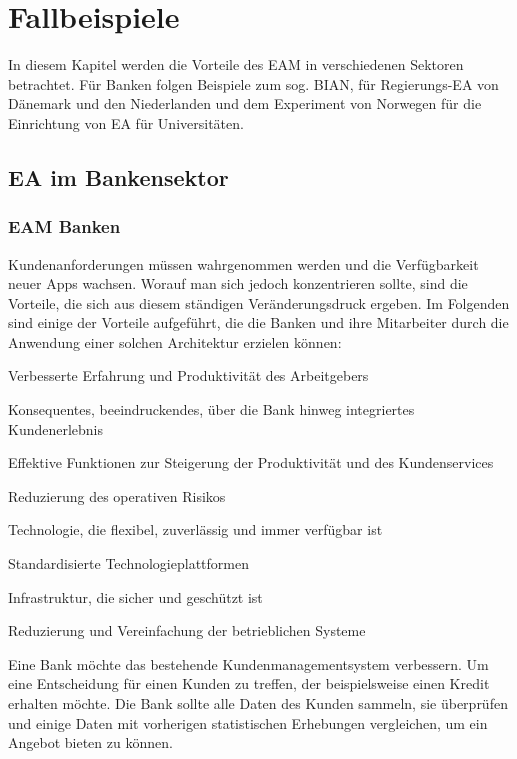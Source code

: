 \documentclass[
	doc,
	a4paper,
	helv
	]{apa6}
\begin{document}
\section{Fallbeispiele}
In diesem Kapitel werden die Vorteile des EAM in verschiedenen Sektoren betrachtet. Für Banken folgen Beispiele zum sog. BIAN, für Regierungs-EA von Dänemark und den Niederlanden und dem Experiment von Norwegen für die Einrichtung von EA für Universitäten.

\subsection{EA im Bankensektor}
\subsubsection{EAM Banken}

Kundenanforderungen müssen wahrgenommen werden und die Verfügbarkeit neuer Apps wachsen. Worauf man sich jedoch konzentrieren sollte, sind die Vorteile, die sich aus diesem ständigen Veränderungsdruck ergeben. Im Folgenden sind einige der Vorteile aufgeführt, die die Banken und ihre Mitarbeiter durch die Anwendung einer solchen Architektur erzielen können:

\begin{APAitemize}
\item Verbesserte Erfahrung und Produktivität des Arbeitgebers 
\item Konsequentes, beeindruckendes, über die Bank hinweg integriertes Kundenerlebnis
\item Effektive Funktionen zur Steigerung der Produktivität und des Kundenservices
\item Reduzierung des operativen Risikos
\item Technologie, die flexibel, zuverlässig und immer verfügbar ist
\item Standardisierte Technologieplattformen
\item Infrastruktur, die sicher und geschützt ist
\item Reduzierung und Vereinfachung der betrieblichen Systeme
\end{APAitemize}

\mbox{}

Eine Bank möchte das bestehende Kundenmanagementsystem verbessern. Um eine Entscheidung für einen Kunden zu treffen, der beispielsweise einen Kredit erhalten möchte. Die Bank sollte alle Daten des Kunden sammeln, sie überprüfen und einige Daten mit vorherigen statistischen Erhebungen vergleichen, um ein Angebot bieten zu können.
\end{document}
